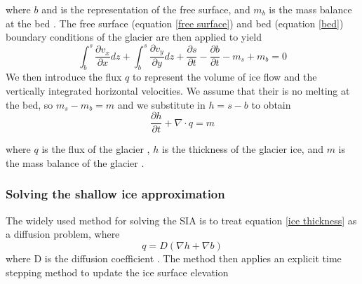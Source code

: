 \documentclass{article}
\begin{document}
where $b$ and is the representation of the free surface, and $m_b$ is the mass balance at the bed \citep{LEMEUR2004, Greve2009}. The free surface (equation \ref{free surface}) and bed (equation \ref{bed}) boundary conditions of the glacier are then applied to yield
\begin{equation}
    \int_b^s \frac{\partial v_x}{\partial x}dz+\int_b^s \frac{\partial v_y}{\partial y}dz+ \frac{\partial s}{\partial t}-\frac{\partial b}{\partial t} -m_s+m_b = 0
\end{equation}
We then introduce the flux $q$ to represent the volume of ice flow and the vertically integrated horizontal velocities. We assume that their is no melting at the bed, so $m_s-m_b=m$ and we substitute in $h = s-b$ to obtain
\begin{equation}\label{ice thickness}
\frac{\partial h}{\partial t} + \nabla \cdot q = m
\end{equation}


where $q$ is the flux of the glacier , $h$ is the thickness of the glacier ice, and $m$ is the mass balance of the glacier \citep{Jarosch2013,Greve2009}.
\subsubsection{Solving the shallow ice approximation}
The widely used method for solving the SIA is to treat equation \ref{ice thickness} as a diffusion problem, where 
\begin{equation} \label{diffusion1}
    q= D(\nabla h + \nabla b)
\end{equation}
where D is the diffusion coefficient \cite{Jarosch2013}. The method then applies an explicit time stepping method to update the ice surface elevation
\end{document}
